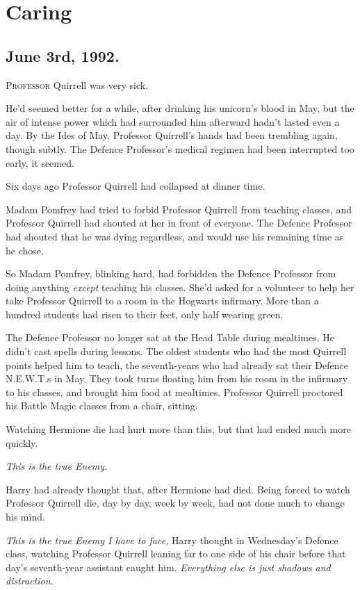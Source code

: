\chapter{Caring}

\section{June 3rd, 1992.}

\lettrine{P}{rofessor} Quirrell was very sick.

\quad\quad
He'd seemed better for a while, after drinking his unicorn's blood in May, but
the air of intense power which had surrounded him afterward hadn't lasted even
a day. By the Ides of May, Professor Quirrell's hands had been trembling again,
though subtly. The Defence Professor's medical regimen had been interrupted too
early, it seemed.

Six days ago Professor Quirrell had collapsed at dinner time.

Madam Pomfrey had tried to forbid Professor Quirrell from teaching classes, and
Professor Quirrell had shouted at her in front of everyone. The Defence
Professor had shouted that he was dying regardless, and would use his remaining
time as he chose.

So Madam Pomfrey, blinking hard, had forbidden the Defence Professor from doing
anything \emph{except} teaching his classes. She'd asked for a volunteer to
help her take Professor Quirrell to a room in the Hogwarts infirmary. More than
a hundred students had risen to their feet, only half wearing green.

The Defence Professor no longer sat at the Head Table during mealtimes. He
didn't cast spells during lessons. The oldest students who had the most
Quirrell points helped him to teach, the seventh-years who had already sat
their Defence N.E.W.T.s in May. They took turns floating him from his room in
the infirmary to his classes, and brought him food at mealtimes. Professor
Quirrell proctored his Battle Magic classes from a chair, sitting.

Watching Hermione die had hurt more than this, but that had ended much more
quickly.

\emph{This is the true Enemy.}

Harry had already thought that, after Hermione had died. Being forced to watch
Professor Quirrell die, day by day, week by week, had not done much to change
his mind.

\emph{This is the true Enemy I have to face,} Harry thought in Wednesday's
Defence class, watching Professor Quirrell leaning far to one side of his chair
before that day's seventh-year assistant caught him. \emph{Everything else is
just shadows and distraction.}

